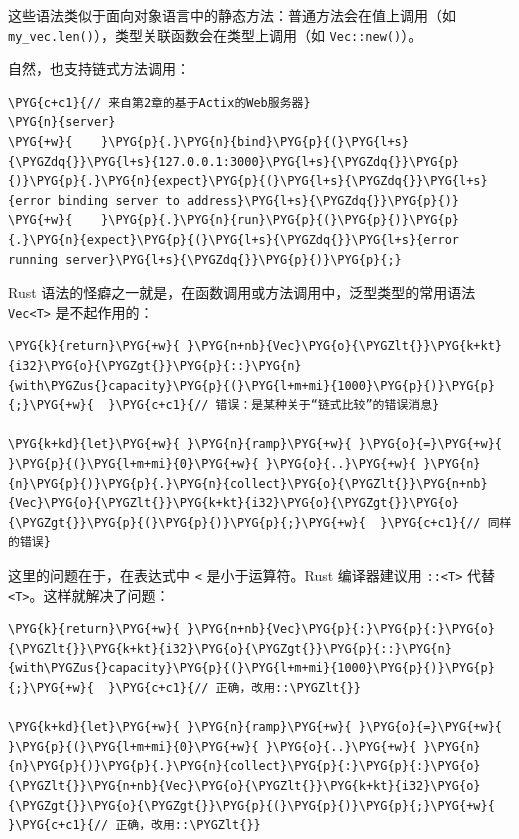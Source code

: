 这些语法类似于面向对象语言中的静态方法：普通方法会在值上调用（如 \texttt{my\_vec.len()}），类型关联函数会在类型上调用（如 \texttt{Vec::new()}）。

自然，也支持链式方法调用：

\begin{Verbatim}[commandchars=\\\{\},breaklines=true,breakanywhere=true,fontsize=\codefont,xleftmargin=17bp]
\PYG{c+c1}{// 来自第2章的基于Actix的Web服务器}
\PYG{n}{server}
\PYG{+w}{    }\PYG{p}{.}\PYG{n}{bind}\PYG{p}{(}\PYG{l+s}{\PYGZdq{}}\PYG{l+s}{127.0.0.1:3000}\PYG{l+s}{\PYGZdq{}}\PYG{p}{)}\PYG{p}{.}\PYG{n}{expect}\PYG{p}{(}\PYG{l+s}{\PYGZdq{}}\PYG{l+s}{error binding server to address}\PYG{l+s}{\PYGZdq{}}\PYG{p}{)}
\PYG{+w}{    }\PYG{p}{.}\PYG{n}{run}\PYG{p}{(}\PYG{p}{)}\PYG{p}{.}\PYG{n}{expect}\PYG{p}{(}\PYG{l+s}{\PYGZdq{}}\PYG{l+s}{error running server}\PYG{l+s}{\PYGZdq{}}\PYG{p}{)}\PYG{p}{;}
\end{Verbatim}

Rust 语法的怪癖之一就是，在函数调用或方法调用中，泛型类型的常用语法 \texttt{Vec<T>} 是不起作用的：

\begin{Verbatim}[commandchars=\\\{\},breaklines=true,breakanywhere=true,fontsize=\codefont,xleftmargin=17bp]
\PYG{k}{return}\PYG{+w}{ }\PYG{n+nb}{Vec}\PYG{o}{\PYGZlt{}}\PYG{k+kt}{i32}\PYG{o}{\PYGZgt{}}\PYG{p}{::}\PYG{n}{with\PYGZus{}capacity}\PYG{p}{(}\PYG{l+m+mi}{1000}\PYG{p}{)}\PYG{p}{;}\PYG{+w}{  }\PYG{c+c1}{// 错误：是某种关于“链式比较”的错误消息}

\PYG{k+kd}{let}\PYG{+w}{ }\PYG{n}{ramp}\PYG{+w}{ }\PYG{o}{=}\PYG{+w}{ }\PYG{p}{(}\PYG{l+m+mi}{0}\PYG{+w}{ }\PYG{o}{..}\PYG{+w}{ }\PYG{n}{n}\PYG{p}{)}\PYG{p}{.}\PYG{n}{collect}\PYG{o}{\PYGZlt{}}\PYG{n+nb}{Vec}\PYG{o}{\PYGZlt{}}\PYG{k+kt}{i32}\PYG{o}{\PYGZgt{}}\PYG{o}{\PYGZgt{}}\PYG{p}{(}\PYG{p}{)}\PYG{p}{;}\PYG{+w}{  }\PYG{c+c1}{// 同样的错误}
\end{Verbatim}

这里的问题在于，在表达式中 \texttt{<} 是小于运算符。Rust 编译器建议用 \texttt{::<T>} 代替 \texttt{<T>}。这样就解决了问题：

\begin{Verbatim}[commandchars=\\\{\},breaklines=true,breakanywhere=true,fontsize=\codefont,xleftmargin=17bp]
\PYG{k}{return}\PYG{+w}{ }\PYG{n+nb}{Vec}\PYG{p}{:}\PYG{p}{:}\PYG{o}{\PYGZlt{}}\PYG{k+kt}{i32}\PYG{o}{\PYGZgt{}}\PYG{p}{::}\PYG{n}{with\PYGZus{}capacity}\PYG{p}{(}\PYG{l+m+mi}{1000}\PYG{p}{)}\PYG{p}{;}\PYG{+w}{  }\PYG{c+c1}{// 正确，改用::\PYGZlt{}}

\PYG{k+kd}{let}\PYG{+w}{ }\PYG{n}{ramp}\PYG{+w}{ }\PYG{o}{=}\PYG{+w}{ }\PYG{p}{(}\PYG{l+m+mi}{0}\PYG{+w}{ }\PYG{o}{..}\PYG{+w}{ }\PYG{n}{n}\PYG{p}{)}\PYG{p}{.}\PYG{n}{collect}\PYG{p}{:}\PYG{p}{:}\PYG{o}{\PYGZlt{}}\PYG{n+nb}{Vec}\PYG{o}{\PYGZlt{}}\PYG{k+kt}{i32}\PYG{o}{\PYGZgt{}}\PYG{o}{\PYGZgt{}}\PYG{p}{(}\PYG{p}{)}\PYG{p}{;}\PYG{+w}{  }\PYG{c+c1}{// 正确，改用::\PYGZlt{}}
\end{Verbatim}

